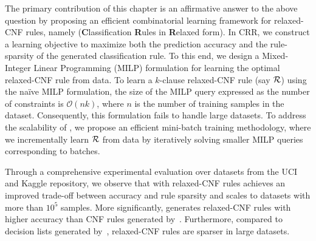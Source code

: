The primary contribution of this chapter is an affirmative answer to the above question by proposing an efficient combinatorial learning framework for relaxed-CNF rules, namely {\crr} (\textbf{C}lassification \textbf{R}ules in \textbf{R}elaxed form). In CRR, we construct a learning objective to maximize both the prediction accuracy and the rule-sparsity of the generated classification rule. To this end, we design a  Mixed-Integer Linear Programming (MILP) formulation for learning the optimal relaxed-CNF rule from data. To learn a $ k $-clause relaxed-CNF rule (say $ {\mathcal{R}} $) using the na\"ive MILP formulation, the size of the MILP query expressed as the number of constraints is $ \mathcal{O}(nk) $, where $ n $ is the number of training samples in the dataset. Consequently, this formulation fails to handle large datasets. To address the scalability of {\crr},  we propose an efficient mini-batch training methodology, where we incrementally learn $ {\mathcal{R}} $ from data by iteratively solving smaller MILP queries corresponding to batches. 

{Through a comprehensive experimental evaluation over datasets from the UCI and Kaggle repository, we observe that {\crr} with relaxed-CNF rules achieves an improved trade-off between accuracy and rule sparsity and scales to datasets with more than $ 10^5 $ samples. More significantly, {\crr} generates relaxed-CNF rules with higher accuracy than CNF rules generated by~\cite{GM2019}. Furthermore, compared to decision lists generated by~\cite{cohen1995fast}, relaxed-CNF rules are sparser in large datasets.}
%


